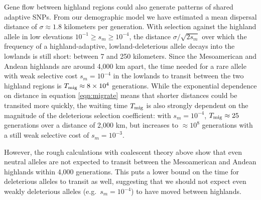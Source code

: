 Gene flow between highland regions could also generate patterns of shared adaptive SNPs.
From our demographic model we have estimated a mean dispersal distance of $\sigma \approx 1.8$ kilometers per generation.
With selection against the highland allele in low elevations $10^{-1} \ge s_m \ge 10^{-4}$, 
the distance $\sigma/\sqrt{2s_m}$ over which the frequency of a highland-adaptive, lowland-deleterious allele decays into the lowlands is still short: 
between 7 and 250 kilometers.
Since the Mesoamerican and Andean highlands are around 4,000 km apart, the time needed for a rare allele with weak selective cost $s_m=10^{-4}$ in the lowlands 
to transit between the two highland regions is $T_{\text{mig}} \approx 8 \times 10^{4}$ generations. 
While the exponential dependence on distance in equation \eqref{eqn:migrate} means that shorter distances could be transited more quickly, the waiting time $T_{\text{mig}}$ is also strongly dependent on the magnitude of the deleterious selection coefficient: with $s_m=10^{-4}$, $T_{\text{mig}} \approx 25$ generations over a distance of 2,000 km, but increases to $\approx 10^{8}$ generations with a still weak selective cost of $s_m=10^{-3}$.


However, the rough calculations with coalescent theory above show that even neutral alleles are not expected to transit between the Mesoamerican and Andean highlands within 4,000 generations.
This puts a lower bound on the time for deleterious alleles to transit as well, suggesting that we should not expect even weakly deleterious alleles (e.g.\ $s_m=10^{-4}$) to have moved between highlands.

